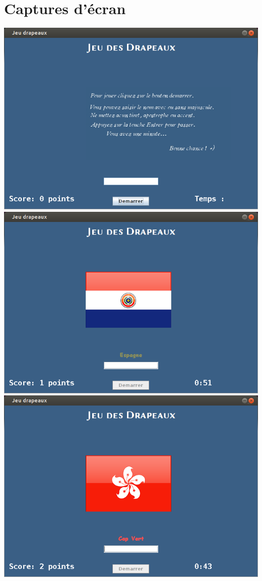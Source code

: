 \documentclass{article}
\begin{document}
\newpage
\section{Captures d'écran}
\begin{center}
\includegraphics[scale=0.5]{intro.png}\\
\includegraphics[scale=0.5]{capture1.png}\\
\includegraphics[scale=0.5]{capture2.png}\\

\end{center}
\end{document}
